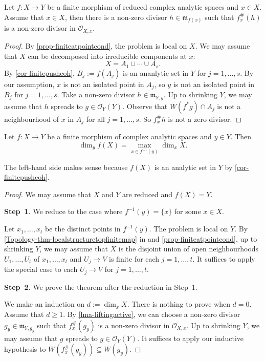 \begin{lemma}\label{lma-liftingactive}
    Let $f:X\rightarrow Y$ be a finite morphism of reduced complex analytic spaces and $x\in X$. Assume that $x\in X$, then there is a non-zero divisor $h\in \mathfrak{m}_{f(x)}$ such that $f^{\#}_x(h)$ is a non-zero divisor in $\mathcal{O}_{X,x}$.
\end{lemma}
\begin{proof}
    By \cref{prop-finiteatpointcond}, the problem is local on $X$. We may assume that $X$ can be decomposed into irreducible components at $x$:
    \[
        X=A_1\cup \cdots\cup A_s.    
    \] 
    By \cref{cor-finitepushcoh}, $B_j:=f(A_j)$ is an ananlytic set in $Y$ for $j=1,\ldots,s$. By our assumption, $x$ is not an isolated point in $A_j$, so $y$ is not an isolated point in $B_j$ for $j=1,\ldots,s$. Take a non-zero divisor $h\in \mathfrak{m}_{Y,y}$. Up to shrinking $Y$, we may assume that $h$ spreads to $g\in \mathcal{O}_Y(Y)$. Observe that $W(f^*g)\cap A_j$ is not a neighbourhood of $x$ in $A_j$ for all $j=1,\ldots,s$. So $f^{\#}_xh$ is not a zero divisor.
\end{proof}

\begin{thm}\label{thm-finitemapdim}
    Let $f:X\rightarrow Y$ be a finite morphism of complex analytic spaces and $y\in Y$. Then
    \[
        \dim_y f(X)=\max_{x\in f^{-1}(y)}\dim_x X.  
    \]
\end{thm}
The left-hand side makes sense because $f(X)$ is an analytic set in $Y$ by \cref{cor-finitepushcoh}.
\begin{proof}
    We may assume that $X$ and $Y$ are reduced and $f(X)=Y$.

    \textbf{Step~1}. We reduce to the case where $f^{-1}(y)=\{x\}$ for some $x\in X$.

    Let $x_1,\ldots,x_t$ be the distinct points in $f^{-1}(y)$. The problem is local on $Y$.
    By \cref{Topology-thm-localstructuretopfinitemap} in  and \cref{prop-finiteatpointcond}, up to shrinking $Y$, we may assume that $X$ is the disjoint union of open neighbourhoods $U_1,\ldots,U_t$ of $x_1,\ldots,x_t$ and $U_j\rightarrow V$ is finite for each $j=1,\ldots,t$. It suffices to apply the special case to each $U_j\rightarrow V$ for $j=1,\ldots,t$.

    \textbf{Step~2}. We prove the theorem after the reduction in Step~1.

    We make an induction on $d:=\dim_x X$. There is nothing to prove when $d=0$. Assume that $d\geq 1$. By \cref{lma-liftingactive}, we can choose a non-zero divisor $g_y\in \mathfrak{m}_{Y,g_y}$ such that $f^{\#}_x(g_y)$ is a non-zero divisor in $\mathcal{O}_{X,x}$. Up to shrinking $Y$, we may assume that $g$ spreads to $g\in \mathcal{O}_Y(Y)$. It suffices to apply our inductive hypothesis to $W(f^{\#}_x(g_y))\subseteq W(g_y)$.
\end{proof}




